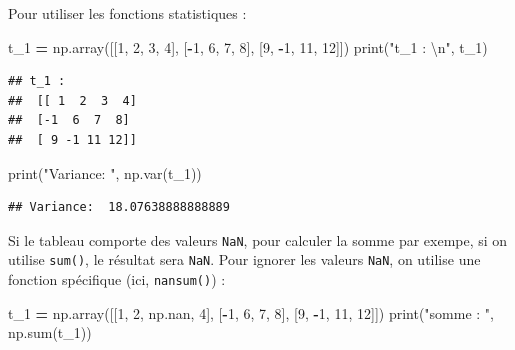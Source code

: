 \documentclass[
  12pt,
]{book}
\newenvironment{Shaded}{\begin{snugshade}}{\end{snugshade}}
\newcommand{\BuiltInTok}[1]{#1}
\newcommand{\CharTok}[1]{\textcolor[rgb]{0.31,0.60,0.02}{#1}}
\newcommand{\DecValTok}[1]{\textcolor[rgb]{0.00,0.00,0.81}{#1}}
\newcommand{\NormalTok}[1]{#1}
\newcommand{\OperatorTok}[1]{\textcolor[rgb]{0.81,0.36,0.00}{\textbf{#1}}}
\newcommand{\StringTok}[1]{\textcolor[rgb]{0.31,0.60,0.02}{#1}}
\numberwithin{equation}{section}
\numberwithin{countremarque}{section}
\begin{document}
Pour utiliser les fonctions statistiques :

\begin{Shaded}
\begin{Highlighting}[]
\NormalTok{t\_1 }\OperatorTok{=}\NormalTok{ np.array([[}\DecValTok{1}\NormalTok{, }\DecValTok{2}\NormalTok{, }\DecValTok{3}\NormalTok{, }\DecValTok{4}\NormalTok{], [}\OperatorTok{{-}}\DecValTok{1}\NormalTok{, }\DecValTok{6}\NormalTok{, }\DecValTok{7}\NormalTok{, }\DecValTok{8}\NormalTok{], [}\DecValTok{9}\NormalTok{, }\OperatorTok{{-}}\DecValTok{1}\NormalTok{, }\DecValTok{11}\NormalTok{, }\DecValTok{12}\NormalTok{]])}
\BuiltInTok{print}\NormalTok{(}\StringTok{"t\_1 : }\CharTok{\textbackslash{}n}\StringTok{"}\NormalTok{, t\_1)}
\end{Highlighting}
\end{Shaded}

\begin{lstlisting}
## t_1 : 
##  [[ 1  2  3  4]
##  [-1  6  7  8]
##  [ 9 -1 11 12]]
\end{lstlisting}

\begin{Shaded}
\begin{Highlighting}[]
\BuiltInTok{print}\NormalTok{(}\StringTok{"Variance: "}\NormalTok{, np.var(t\_1))}
\end{Highlighting}
\end{Shaded}

\begin{lstlisting}
## Variance:  18.07638888888889
\end{lstlisting}

Si le tableau comporte des valeurs \texttt{NaN}, pour calculer la somme par exempe, si on utilise \texttt{sum()}, le résultat sera \texttt{NaN}. Pour ignorer les valeurs \texttt{NaN}, on utilise une fonction spécifique (ici, \texttt{nansum()}) :

\begin{Shaded}
\begin{Highlighting}[]
\NormalTok{t\_1 }\OperatorTok{=}\NormalTok{ np.array([[}\DecValTok{1}\NormalTok{, }\DecValTok{2}\NormalTok{, np.nan, }\DecValTok{4}\NormalTok{], [}\OperatorTok{{-}}\DecValTok{1}\NormalTok{, }\DecValTok{6}\NormalTok{, }\DecValTok{7}\NormalTok{, }\DecValTok{8}\NormalTok{], [}\DecValTok{9}\NormalTok{, }\OperatorTok{{-}}\DecValTok{1}\NormalTok{, }\DecValTok{11}\NormalTok{, }\DecValTok{12}\NormalTok{]])}
\BuiltInTok{print}\NormalTok{(}\StringTok{"somme : "}\NormalTok{, np.}\BuiltInTok{sum}\NormalTok{(t\_1))}
\end{Highlighting}
\end{Shaded}
\end{document}
